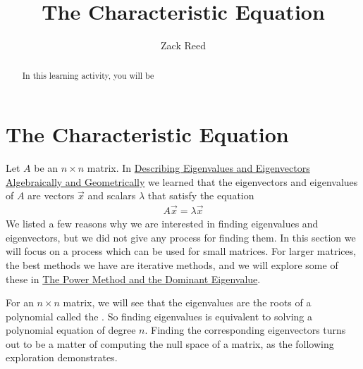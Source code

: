 \documentclass{ximera}
\author{Zack Reed}
\title{The Characteristic Equation}
\begin{document}
\begin{abstract}

    In this learning activity, you will be 
\end{abstract}
\maketitle


\section*{The Characteristic Equation}

    
Let $A$ be an $n \times n$ matrix.  In \href{https://ximera.osu.edu/oerlinalg/LinearAlgebra/EIG-0010/main}{Describing Eigenvalues and Eigenvectors Algebraically and Geometrically} we learned that the eigenvectors and eigenvalues of $A$ are vectors $\vec{x}$ and scalars $\lambda$ that satisfy the equation 
\begin{align}\label{def:eigen} A \vec{x} = \lambda \vec{x}\end{align}
We listed a few reasons why we are interested in finding eigenvalues and eigenvectors, but we did not give any process for finding them.  In this section we will focus on a process which can be used for small matrices.  For larger matrices, the best methods we have are iterative methods, and we will explore some of these in \href{https://ximera.osu.edu/oerlinalg/LinearAlgebra/EIG-0070/main}{The Power Method and the Dominant Eigenvalue}.
    
For an $n \times n$ matrix, we will see that the eigenvalues are the roots of a polynomial called the .  So finding eigenvalues is equivalent to solving a polynomial equation of degree $n$.  Finding the corresponding eigenvectors turns out to be a matter of computing the null space of a matrix, as the following exploration demonstrates.
    
\end{document}
